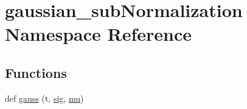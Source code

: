 \hypertarget{namespacegaussian__subNormalization}{}\section{gaussian\+\_\+sub\+Normalization Namespace Reference}
\label{namespacegaussian__subNormalization}
\subsection*{Functions}
\begin{DoxyCompactItemize}
\item 
def \hyperlink{namespacegaussian__subNormalization_a9fdfba6c3add14aed634ae6cf69a4091}{gauss} (t, \hyperlink{namespacegaussian__subNormalization_ab1fe9cd4fd57a3a2c62f71c59a177f8c}{sig}, \hyperlink{namespacegaussian__subNormalization_ac40e7f2c15e55a01c0ac9b9c90af6c47}{mu})
\end{DoxyCompactItemize}
